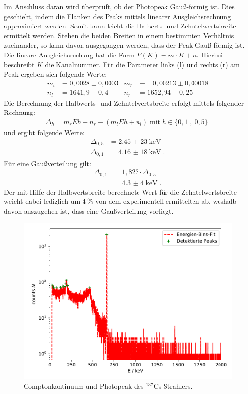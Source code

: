 \noindent Im Anschluss daran wird überprüft, ob der Photopeak Gauß-förmig ist.
Dies geschieht, indem die Flanken des Peaks mittels linearer Ausgleichsrechnung approximiert werden. Somit kann leicht die Halberts- und Zehntelwertsbreite ermittelt werden. Stehen die beiden Breiten in einem bestimmten Verhältnis zueinander, so kann davon ausgegangen werden, dass der Peak Gauß-förmig ist.
Die lineare Ausgleichsrechung hat die Form $F(K) = m \cdot K + n$. Hierbei beschreibt $K$ die Kanalnummer.
Für die Parameter links (l) und rechts (r) am Peak ergeben sich folgende Werte:
\begin{align*}
    m_l &= 0,0028 \pm 0,0003 & m_r &= -0,00213 \pm 0,00018 \\
    n_l &= 1641,9 \pm 0,4    & n_r &=  1652,94 \pm 0,25
\end{align*}
Die Berechnung der Halbwerts- und Zehntelwertsbreite erfolgt mittels folgender Rechnung:
\begin{align*}
    \Delta_{h} = m_r E h + n_r - (m_l E h + n_l) \; \text{mit} \; h \in \{0,1 \; , \; 0,5\} \;
\end{align*}
und ergibt folgende Werte:
\begin{align*}
    \Delta_{0,5} &= \SI{2,45(23)}{\kilo \electronvolt}\\    %
    \Delta_{0,1} &= \SI{4,16(18)}{\kilo \electronvolt} \; . %
\end{align*}
Für eine Gaußverteilung gilt:
\begin{align*}
    \Delta_{0,1} &= 1,823 \cdot \Delta_{0,5} \\
                 &= \SI{4,3(4)}{\kilo \electronvolt} \; .
\end{align*}
Der mit Hilfe der Halbwertsbreite berechnete Wert für die Zehntelwertsbreite weicht
dabei lediglich um $\SI{4}{\percent}$ von dem experimentell ermittelten ab, weshalb
davon auszugehen ist, dass eine Gaußverteilung vorliegt.
\FloatBarrier
\begin{figure}
    \centering
    \includegraphics[scale=0.7]{Cs_fit.pdf}
    \caption{Comptonkontinuum und Photopeak des $^{137}$Cs-Strahlers.}
    \label{abb:Cs_peaks}
\end{figure}
\FloatBarrier

